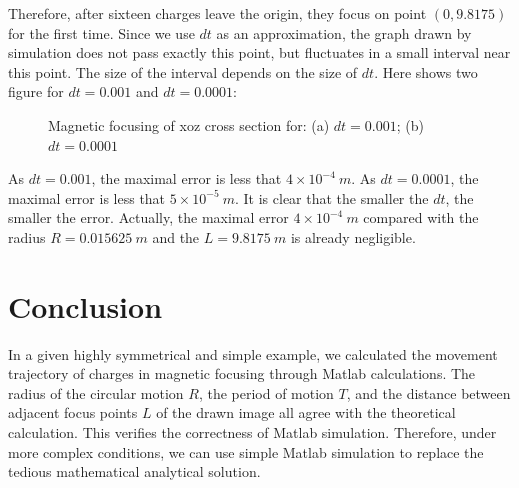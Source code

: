 \documentclass[journal,twocolumn,letterpaper]{IEEEJERM}
\begin{document}
Therefore, after sixteen charges leave the origin, they focus on point $ (0,9.8175) $ for the first time. Since we use $ dt $ as an approximation, the graph drawn by simulation does not pass exactly this point, but fluctuates in a small interval near this point. The size of the interval depends on the size of $ dt $. Here shows two figure for $ dt=0.001 $ and $ dt=0.0001 $:
\begin{figure}[H]   
	\centering	  
	    \label{6a}\hfill	  
	\label{6b}
	\caption{Magnetic focusing of xoz cross section for: (a) $ dt=0.001 $; (b) $ dt=0.0001 $} 
	\label{fig6} 
\end{figure}

As $dt=0.001  $, the maximal error is less that $ 4\times 10^{-4}\ m $. As $ dt=0.0001 $, the maximal error is less that $ 5\times 10^{-5}\ m $. It is clear that the smaller the $ dt $, the smaller the error. Actually, the maximal error $ 4\times 10^{-4}\ m $ compared with the radius $ R=0.015625\ m $ and the $ L=9.8175\ m $ is already negligible.

\section{Conclusion}
In a given highly symmetrical and simple example, we calculated the movement trajectory of charges in magnetic focusing through Matlab calculations. The radius of the circular motion $ R $, the period of motion $ T $, and the distance between adjacent focus points $ L $ of the drawn image all agree with the theoretical calculation. This verifies the correctness of Matlab simulation. Therefore, under more complex conditions, we can use simple Matlab simulation to replace the tedious mathematical analytical solution.
\end{document}
